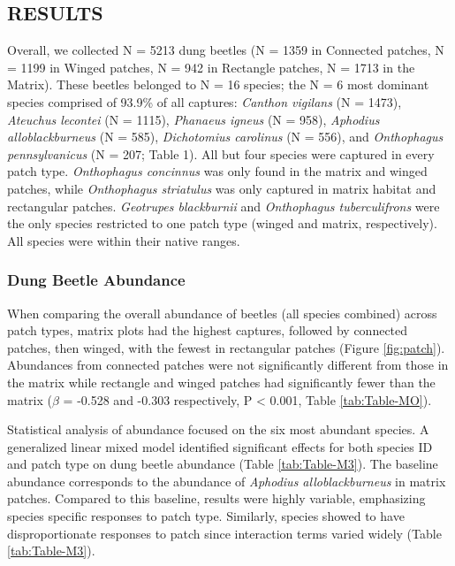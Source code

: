 \documentclass[
  man, donotrepeattitle]{apa6}
\begin{document}
\subsection{RESULTS}\label{results}

Overall, we collected N = 5213 dung beetles (N = 1359 in Connected patches, N = 1199 in Winged patches, N = 942 in Rectangle patches, N = 1713 in the Matrix). These beetles belonged to N = 16 species; the N = 6 most dominant species comprised of 93.9\% of all captures: \textit{Canthon vigilans} (N = 1473), \textit{Ateuchus lecontei} (N = 1115), \textit{Phanaeus igneus} (N = 958), \textit{Aphodius alloblackburneus} (N = 585), \textit{Dichotomius carolinus} (N = 556), and \textit{Onthophagus pennsylvanicus} (N = 207; Table 1). All but four species were captured in every patch type. \emph{Onthophagus concinnus} was only found in the matrix and winged patches, while \emph{Onthophagus striatulus} was only captured in matrix habitat and rectangular patches. \emph{Geotrupes blackburnii} and \emph{Onthophagus tuberculifrons} were the only species restricted to one patch type (winged and matrix, respectively). All species were within their native ranges.

\subsubsection{Dung Beetle Abundance}\label{dung-beetle-abundance}

When comparing the overall abundance of beetles (all species combined) across patch types, matrix plots had the highest captures, followed by connected patches, then winged, with the fewest in rectangular patches (Figure \ref{fig:patch}). Abundances from connected patches were not significantly different from those in the matrix while rectangle and winged patches had significantly fewer than the matrix (\(\beta\) = -0.528 and -0.303 respectively, P \textless{} 0.001, Table \ref{tab:Table-MO}).

Statistical analysis of abundance focused on the six most abundant species. A generalized linear mixed model identified significant effects for both species ID and patch type on dung beetle abundance (Table \ref{tab:Table-M3}). The baseline abundance corresponds to the abundance of \emph{Aphodius alloblackburneus} in matrix patches. Compared to this baseline, results were highly variable, emphasizing species specific responses to patch type. Similarly, species showed to have disproportionate responses to patch since interaction terms varied widely (Table \ref{tab:Table-M3}).
\end{document}
